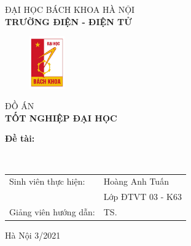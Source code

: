 \documentclass{article}%
\begin{document}
\begin{titlepage}
\begin{center}
\vspace{-12pt} ĐẠI HỌC BÁCH KHOA HÀ NỘI \\ %
\textbf{\fontsize{16pt}{0pt}\selectfont TRƯỜNG ĐIỆN - ĐIỆN TỬ}
\begin{figure}[H] %
    \vspace{0.5cm} %
    \centering
    \includegraphics[width=1.53cm,height=2.26cm]{Images/logohust.png}
\end{figure}
\vspace{1.5cm}
\fontsize{24pt}{0pt}\selectfont ĐỒ ÁN \\ %
\vspace{12pt}
\textbf{\fontsize{32pt}{0pt}\selectfont TỐT NGHIỆP ĐẠI HỌC} %
\vspace{1.5cm}
\end{center}
\hspace{6pt}\textbf{\fontsize{14pt}{0pt}\selectfont Đề tài:}
\begin{center}
     \textbf{\fontsize{20pt}{0pt}\selectfont }\\
     \textbf{\fontsize{20pt}{0pt}\selectfont }

\vspace{1.5cm}

\begin{table}[H]%
     \centering
     \begin{tabular}{l l}
          \fontsize{14pt}{0pt}\selectfont Sinh viên thực hiện:      & \fontsize{14pt}{0pt}\selectfont Hoàng Anh Tuấn \vspace{6pt} \\
           &\fontsize{14pt}{0pt}\selectfont Lớp ĐTVT 03 - K63 \vspace{6pt} \\
          \fontsize{14pt}{0pt}\selectfont Giảng viên hướng dẫn: & \fontsize{14pt}{0pt}\selectfont TS.  
     
     \end{tabular}
\end{table}
\vspace{3.5cm} %
\fontsize{14pt}{0pt}\selectfont Hà Nội 3/2021
\end{center}
\end{titlepage}
\end{document}
